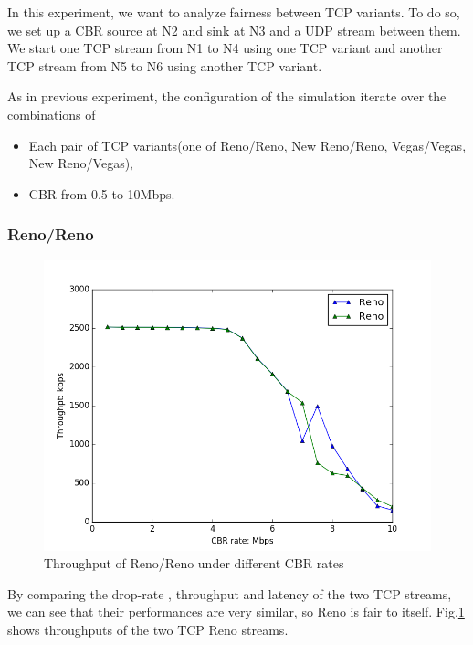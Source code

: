 \documentclass[10pt, conference]{IEEEtran/IEEEtran}
\begin{document}
In this experiment, we want to analyze fairness between TCP variants. To do so, we set up a CBR source at N2 and sink at N3 and a UDP stream between them. We start one TCP stream from N1 to N4 using one TCP
variant and another TCP stream from N5 to N6 using another TCP variant.

As in previous experiment, the configuration of the simulation iterate over the combinations of 
\begin{itemize}
\item Each pair of TCP variants(one of Reno/Reno, New Reno/Reno, Vegas/Vegas,
New Reno/Vegas), 
\item CBR from 0.5 to 10Mbps.
\end{itemize}

\subsubsection{Reno/Reno}
\begin{figure}[!ht]
\begin{center}
\includegraphics[width=\linewidth]{../exp2/exp2_Reno_Reno_thpt.png}
\caption{Throughput of Reno/Reno under different CBR rates}
\label{exp2_Reno_Reno_thpt}
\end{center}
\end{figure}

By comparing the drop-rate , throughput and latency of the two TCP streams,  we can see that their performances are very similar, so Reno is fair to itself. 
Fig.\ref{exp2_Reno_Reno_thpt} shows throughputs of the two TCP Reno streams.

\end{document}
